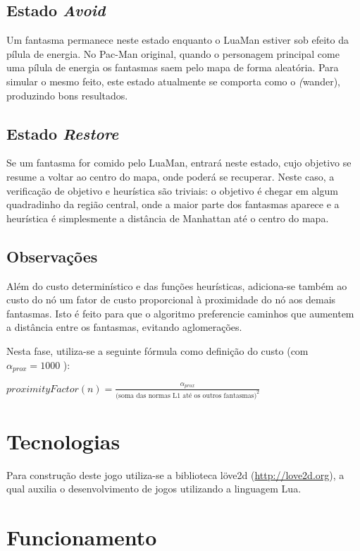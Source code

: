 \documentclass[a4paper]{scrartcl}
\begin{document}
\subsection{Estado \textit{Avoid}}

Um fantasma permanece neste estado enquanto o LuaMan estiver sob efeito da pílula de energia.
No Pac-Man original, quando o personagem principal come uma pílula de energia os fantasmas saem
pelo mapa de forma aleatória. Para simular o mesmo feito, este estado atualmente se comporta como
o \textit(wander), produzindo bons resultados.

\subsection{Estado \textit{Restore}}

Se um fantasma for comido pelo LuaMan, entrará neste estado, cujo objetivo se resume a voltar ao
centro do mapa, onde poderá se recuperar. Neste caso, a verificação de objetivo e heurística são triviais: o objetivo é chegar em algum quadradinho da região central, onde a maior parte dos fantasmas aparece e a heurística é simplesmente a distância de Manhattan até o centro do mapa.

\subsection{Observações}

Além do custo determinístico e das funções heurísticas, adiciona-se também ao custo do
nó um fator de custo proporcional à proximidade do nó aos demais fantasmas. Isto é feito
para que o algoritmo preferencie caminhos que aumentem a distância entre os fantasmas, evitando
aglomerações.

Nesta fase, utiliza-se a seguinte fórmula como definição do custo (com $\alpha_{prox} = 1000$ ):

$proximityFactor(n) =  \frac{\alpha_{prox}}{\text{{(soma das normas L1 até os outros fantasmas})}^2}$

\section{Tecnologias}

Para construção deste jogo utiliza-se a biblioteca löve2d (\url{http://love2d.org}),
a qual auxilia o desenvolvimento de jogos utilizando a linguagem Lua.

\section{Funcionamento}
\end{document}
